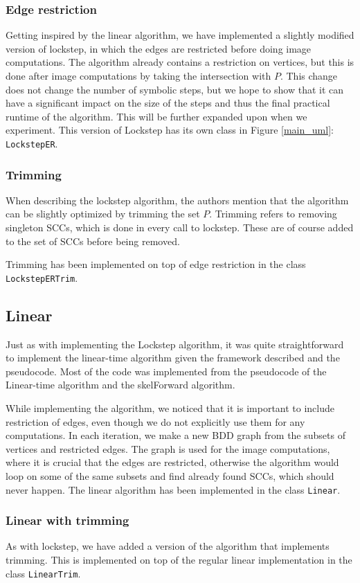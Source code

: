 \documentclass[../master/master.tex]{subfiles}
\begin{document}
\subsubsection{Edge restriction}
Getting inspired by the linear algorithm, we have implemented a slightly modified version of lockstep, in which the edges are restricted before doing image computations. The algorithm already contains a restriction on vertices, but this is done after image computations by taking the intersection with $P$. This change does not change the number of symbolic steps, but we hope to show that it can have a significant impact on the size of the steps and thus the final practical runtime of the algorithm. This will be further expanded upon when we experiment. This version of Lockstep has its own class in Figure \ref{main_uml}: \texttt{LockstepER}.

\subsubsection{Trimming}
When describing the lockstep algorithm\cite{lockstep}, the authors mention that the algorithm can be slightly optimized by trimming the set $P$. Trimming refers to removing singleton SCCs, which is done in every call to lockstep. These are of course added to the set of SCCs before being removed.

Trimming has been implemented on top of edge restriction in the class \texttt{LockstepERTrim}.

\subsection{Linear}
Just as with implementing the Lockstep algorithm, it was quite straightforward to implement the linear-time algorithm given the framework described and the pseudocode. Most of the code was implemented from the pseudocode of the Linear-time algorithm and the skelForward algorithm.

While implementing the algorithm, we noticed that it is important to include restriction of edges, even though we do not explicitly use them for any computations. In each iteration, we make a new BDD graph from the subsets of vertices and restricted edges. The graph is used for the image computations, where it is crucial that the edges are restricted, otherwise the algorithm would loop on some of the same subsets and find already found SCCs, which should never happen.
The linear algorithm has been implemented in the class \texttt{Linear}. 

\subsubsection{Linear with trimming}
As with lockstep, we have added a version of the algorithm that implements trimming. This is implemented on top of the regular linear implementation in the class \texttt{LinearTrim}.
\end{document}
